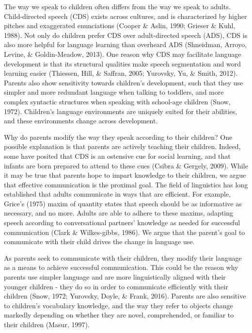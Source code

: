 \documentclass[10pt, letterpaper]{article}
\begin{document}
The way we speak to children often differs from the way we speak to
adults. Child-directed speech (CDS) exists across cultures, and is
characterized by higher pitches and exaggerated enunciations (Cooper \&
Aslin, 1990; Grieser \& Kuhl, 1988). Not only do children prefer CDS
over adult-directed speech (ADS), CDS is also more helpful for language
learning than overheard ADS (Shneidman, Arroyo, Levine, \&
Goldin-Meadow, 2013). One reason why CDS may facilitate language
development is that its structural qualities make speech segmentation
and word learning easier (Thiessen, Hill, \& Saffran, 2005; Yurovsky,
Yu, \& Smith, 2012). Parents also show sensitivity towards children's
development, such that they use simpler and more redundant language when
talking to toddlers, and more complex syntactic structures when speaking
with school-age children (Snow, 1972). Children's language environments
are uniquely suited for their abilities, and these environments change
across development.

Why do parents modify the way they speak according to their children?
One possible explanation is that parents are actively teaching their
children. Indeed, some have posited that CDS is an ostensive cue for
social learning, and that infants are born prepared to attend to these
cues (Csibra \& Gergely, 2009). While it may be true that parents hope
to impart knowledge to their children, we argue that effective
communication is the proximal goal. The field of linguistics has long
established that adults communicate in ways that are efficient. For
example, Grice's (1975) maxim of quantity states that speech should be
as informative as necessary, and no more. Adults are able to adhere to
these maxims, adapting speech according to conversational partners'
knowledge as needed for successful communication (Clark \& Wilkes-gibbs,
1986). We argue that the parent's goal to communicate with their child
drives the change in language use.

As parents seek to communicate with their children, they modify their
language as a means to achieve successful communication. This could be
the reason why parents use simpler language and are more linguistically
aligned with their younger children - they do so in order to communicate
efficiently with their children (Snow, 1972; Yurovsky, Doyle, \& Frank,
2016). Parents are also sensitive to children's vocabulary knowledge,
and the way they refer to objects change markedly depending on whether
they are novel, comprehended, or familiar to their children (Masur,
1997).
\end{document}
